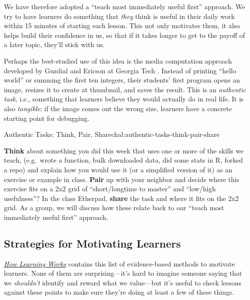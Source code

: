 We have therefore adopted a ``teach most immediately useful first''
approach. We try to have learners do something that \emph{they} think is
useful in their daily work within 15 minutes of starting each lesson.
This not only motivates them, it also helps build their confidence in
us, so that if it takes longer to get to the payoff of a later topic,
they'll stick with us.

Perhaps the best-studied use of this idea is the
media computation approach developed by Guzdial and Ericson at Georgia Tech
\cite{bib:guzdial-mediacomp-retrospective}.
Instead of printing ``hello world'' or summing the first ten integers,
their students' first program opens an image, resizes it to create at
thumbnail, and saves the result. This is an \emph{authentic task}, i.e.,
something that learners believe they would actually do in real life. It
is also \emph{tangible}: if the image comes out the wrong size, learners
have a concrete starting point for debugging.

\begin{challenge}{Authentic Tasks: Think, Pair, Share}{chal:authentic-tasks-think-pair-share}

\textbf{Think} about something you did this week that uses one or more
of the skills we teach, (e.g.~wrote a function, bulk downloaded data,
did some stats in R, forked a repo) and explain how you would use it (or
a simplified version of it) as an exercise or example in class.
\textbf{Pair} up with your neighbor and decide where this exercise fits
on a 2x2 grid of ``short/longtime to master'' and ``low/high
usefulness''? In the class Etherpad, \textbf{share} the task and where
it fits on the 2x2 grid. As a group, we will discuss how these relate
back to our ``teach most immediately useful first'' approach.
\end{challenge}

\subsection{Strategies for Motivating
Learners}\label{strategies-for-motivating-learners}

\emph{\href{http://www.amazon.com/How-Learning-Works-Research-Based-Jossey-Bass/dp/0470484101/}{How
Learning Works}} contains this list of evidence-based methods to
motivate learners. None of them are surprising---it's hard to imagine
someone saying that we \emph{shouldn't} identify and reward what we
value---but it's useful to check lessons against these points to make
sure they're doing at least a few of these things.

